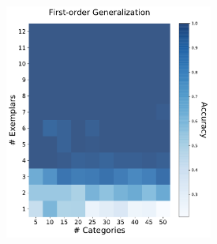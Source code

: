 \begin{figure}[h]
    \begin{center}
        \begin{subfigure}[b]{0.47\textwidth}
            \begin{center}
                \begin{subfigure}[b]{0.48\textwidth}
                    \begin{center}
                        \includegraphics[width=0.98\textwidth]{figures/mlp_1order_accuracy.pdf}
                    \end{center}
                \end{subfigure}
                \begin{subfigure}[b]{0.48\textwidth}
                    \begin{center}

\end{center}
\end{subfigure}
\end{center}
\end{subfigure}
\end{center}
\end{figure}
